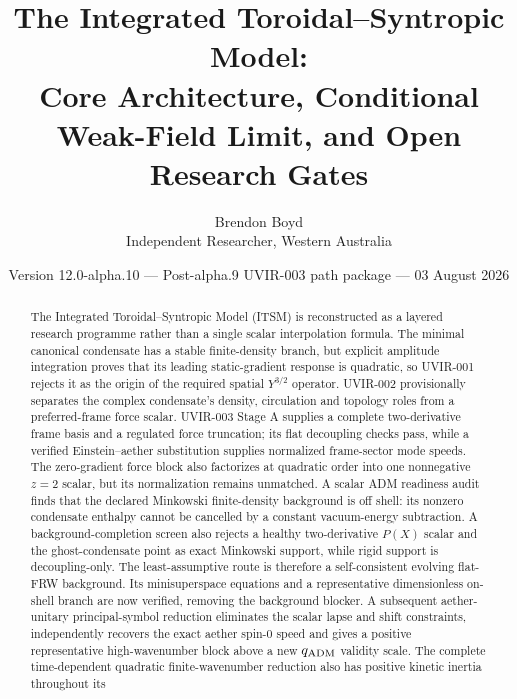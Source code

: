 ﻿\documentclass[11pt]{article}
\title{The Integrated Toroidal--Syntropic Model:\\
Core Architecture, Conditional Weak-Field Limit, and Open Research Gates}
\author{Brendon Boyd\\Independent Researcher, Western Australia}
\date{Version 12.0-alpha.10 --- Post-alpha.9 UVIR-003 path package --- 03 August 2026}
\begin{document}
\maketitle

\begin{center}
\end{center}

\begin{abstract}
The Integrated Toroidal--Syntropic Model (ITSM) is reconstructed as a layered
research programme rather than a single scalar interpolation formula.  The
minimal canonical condensate has a stable finite-density branch, but explicit
amplitude integration proves that its leading static-gradient response is
quadratic, so UVIR-001 rejects it as the origin of the required spatial
$Y^{3/2}$ operator.  UVIR-002 provisionally separates the complex condensate's
density, circulation and topology roles from a preferred-frame force scalar.
UVIR-003 Stage A supplies a complete two-derivative frame basis and a regulated
force truncation; its flat decoupling checks pass, while a verified
Einstein--aether substitution supplies normalized frame-sector mode speeds.
The zero-gradient force block also factorizes at quadratic order into one
nonnegative $z=2$ scalar, but its normalization remains unmatched.  A scalar
ADM readiness audit finds that the declared Minkowski finite-density
background is off shell: its nonzero condensate enthalpy cannot be cancelled
by a constant vacuum-energy subtraction.  A background-completion screen also
rejects a healthy two-derivative $P(X)$ scalar and the ghost-condensate point
as exact Minkowski support, while rigid support is decoupling-only.  The
least-assumptive route is therefore a self-consistent evolving flat-FRW
background.  Its minisuperspace equations and a representative dimensionless
on-shell branch are now verified, removing the background blocker.  A
subsequent aether-unitary principal-symbol reduction eliminates the scalar
lapse and shift constraints, independently recovers the exact aether spin-0
speed and gives a positive representative high-wavenumber block above a new
$q_{\rm ADM}$ validity scale.  The complete time-dependent quadratic
finite-wavenumber reduction also has positive kinetic inertia throughout its

\end{abstract}
\end{document}
